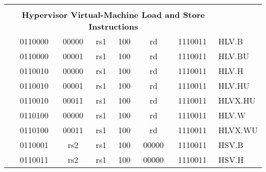 \begin{table}[p]
\begin{small}
\begin{center}
\begin{tabular}{p{0in}p{0.4in}p{0.05in}p{0.05in}p{0.05in}p{0.05in}p{0.4in}p{0.6in}p{0.4in}p{0.6in}p{0.7in}l}
&
\multicolumn{10}{c}{} & \\
&
\multicolumn{10}{c}{\bf Hypervisor Virtual-Machine Load and Store Instructions} & \\
\cline{2-11}


&
\multicolumn{4}{|c|}{0110000} &
\multicolumn{2}{c|}{00000} &
\multicolumn{1}{c|}{rs1} &
\multicolumn{1}{c|}{100} &
\multicolumn{1}{c|}{rd} &
\multicolumn{1}{c|}{1110011} & HLV.B \\
\cline{2-11}


&
\multicolumn{4}{|c|}{0110000} &
\multicolumn{2}{c|}{00001} &
\multicolumn{1}{c|}{rs1} &
\multicolumn{1}{c|}{100} &
\multicolumn{1}{c|}{rd} &
\multicolumn{1}{c|}{1110011} & HLV.BU \\
\cline{2-11}


&
\multicolumn{4}{|c|}{0110010} &
\multicolumn{2}{c|}{00000} &
\multicolumn{1}{c|}{rs1} &
\multicolumn{1}{c|}{100} &
\multicolumn{1}{c|}{rd} &
\multicolumn{1}{c|}{1110011} & HLV.H \\
\cline{2-11}


&
\multicolumn{4}{|c|}{0110010} &
\multicolumn{2}{c|}{00001} &
\multicolumn{1}{c|}{rs1} &
\multicolumn{1}{c|}{100} &
\multicolumn{1}{c|}{rd} &
\multicolumn{1}{c|}{1110011} & HLV.HU \\
\cline{2-11}


&
\multicolumn{4}{|c|}{0110010} &
\multicolumn{2}{c|}{00011} &
\multicolumn{1}{c|}{rs1} &
\multicolumn{1}{c|}{100} &
\multicolumn{1}{c|}{rd} &
\multicolumn{1}{c|}{1110011} & HLVX.HU \\
\cline{2-11}


&
\multicolumn{4}{|c|}{0110100} &
\multicolumn{2}{c|}{00000} &
\multicolumn{1}{c|}{rs1} &
\multicolumn{1}{c|}{100} &
\multicolumn{1}{c|}{rd} &
\multicolumn{1}{c|}{1110011} & HLV.W \\
\cline{2-11}


&
\multicolumn{4}{|c|}{0110100} &
\multicolumn{2}{c|}{00011} &
\multicolumn{1}{c|}{rs1} &
\multicolumn{1}{c|}{100} &
\multicolumn{1}{c|}{rd} &
\multicolumn{1}{c|}{1110011} & HLVX.WU \\
\cline{2-11}


&
\multicolumn{4}{|c|}{0110001} &
\multicolumn{2}{c|}{rs2} &
\multicolumn{1}{c|}{rs1} &
\multicolumn{1}{c|}{100} &
\multicolumn{1}{c|}{00000} &
\multicolumn{1}{c|}{1110011} & HSV.B \\
\cline{2-11}


&
\multicolumn{4}{|c|}{0110011} &
\multicolumn{2}{c|}{rs2} &
\multicolumn{1}{c|}{rs1} &
\multicolumn{1}{c|}{100} &
\multicolumn{1}{c|}{00000} &
\multicolumn{1}{c|}{1110011} & HSV.H \\
\cline{2-11}



\end{tabular}
\end{center}
\end{small}
\end{table}
